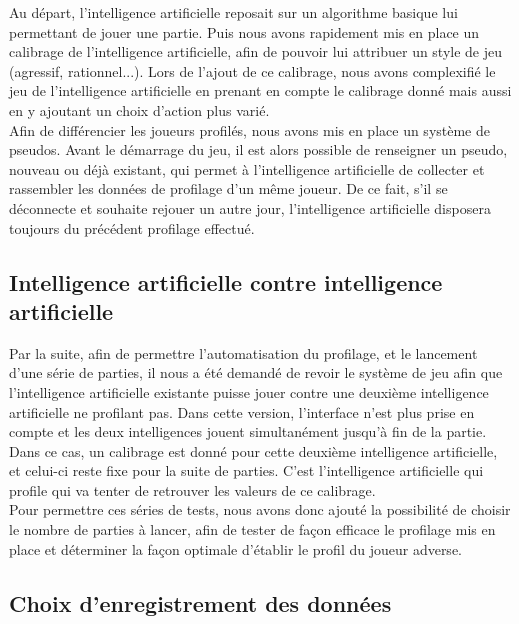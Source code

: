 \documentclass{report}
\begin{document}
Au départ, l'intelligence artificielle reposait sur un algorithme basique lui permettant de jouer une partie. Puis nous avons rapidement mis en place un calibrage de l'intelligence artificielle, afin de pouvoir lui attribuer un style de jeu (agressif, rationnel...). Lors de l'ajout de ce calibrage, nous avons complexifié le jeu de l'intelligence artificielle en prenant en compte le calibrage donné mais aussi en y ajoutant un choix d'action plus varié.\\

Afin de différencier les joueurs profilés, nous avons mis en place un système de pseudos. Avant le démarrage du jeu, il est alors possible de renseigner un pseudo, nouveau ou déjà existant, qui permet à l'intelligence artificielle de collecter et rassembler les données de profilage d'un même joueur. De ce fait, s'il se déconnecte et souhaite rejouer un autre jour, l'intelligence artificielle disposera toujours du précédent profilage effectué.\par

\subsection{Intelligence artificielle contre intelligence artificielle}
\hspace{0.5cm}Par la suite, afin de permettre l'automatisation du profilage, et le lancement d'une série de parties, il nous a été demandé de revoir le système de jeu afin que l'intelligence artificielle existante puisse jouer contre une deuxième intelligence artificielle ne profilant pas. Dans cette version, l'interface n'est plus prise en compte et les deux intelligences jouent simultanément jusqu'à fin de la partie. Dans ce cas, un calibrage est donné pour cette deuxième intelligence artificielle, et celui-ci reste fixe pour la suite de parties. C'est l'intelligence artificielle qui profile qui va tenter de retrouver les valeurs de ce calibrage.\\

Pour permettre ces séries de tests, nous avons donc ajouté la possibilité de choisir le nombre de parties à lancer, afin de tester de façon efficace le profilage mis en place et déterminer la façon optimale d'établir le profil du joueur adverse.\par

\subsection{Choix d'enregistrement des données}
\end{document}
